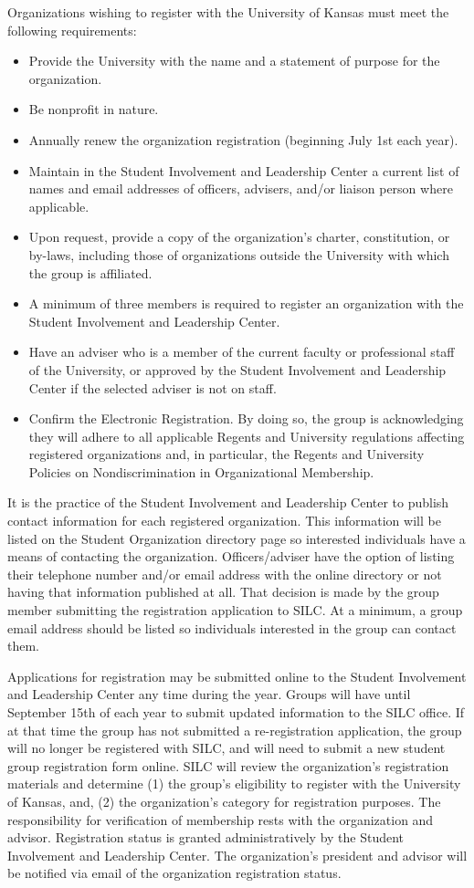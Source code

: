 Organizations wishing to register with the University of Kansas must meet the following requirements:
\begin{itemize}
	\item Provide the University with the name and a statement of purpose for the organization.
	\item Be nonprofit in nature.
	\item Annually renew the organization registration (beginning July 1st each year).
	\item Maintain in the Student Involvement and Leadership Center a current list of names and email addresses of officers, advisers, and/or liaison person where applicable.
	\item Upon request, provide a copy of the organization's charter, constitution, or by-laws, including those of organizations outside the University with which the group is affiliated.
	\item A minimum of three members is required to register an organization with the Student Involvement and Leadership Center.
	\item Have an adviser who is a member of the current faculty or professional staff of the University, or approved by the Student Involvement and Leadership Center if the selected adviser is not on staff.
	\item Confirm the Electronic Registration. By doing so, the group is acknowledging they will adhere to all applicable Regents and University regulations affecting registered organizations and, in particular, the Regents and University Policies on Nondiscrimination in Organizational Membership.
\end{itemize}
It is the practice of the Student Involvement and Leadership Center to publish contact information for each registered organization. This information will be listed on the Student Organization directory page so interested individuals have a means of contacting the organization. Officers/adviser have the option of listing their telephone number and/or email address with the online directory or not having that information published at all. That decision is made by the group member submitting the registration application to SILC. At a minimum, a group email address should be listed so individuals interested in the group can contact them.

Applications for registration may be submitted online to the Student Involvement and Leadership Center any time during the year. Groups will have until September 15th of each year to submit updated information to the SILC office. If at that time the group has not submitted a re-registration application, the group will no longer be registered with SILC, and will need to submit a new student group registration form online. SILC will review the organization's registration materials and determine (1) the group's eligibility to register with the University of Kansas, and, (2) the organization's category for registration purposes. The responsibility for verification of membership rests with the organization and advisor. Registration status is granted administratively by the Student Involvement and Leadership Center. The organization's president and advisor will be notified via email of the organization registration status.

